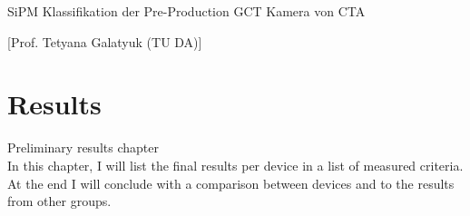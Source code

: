 \documentclass[article,type=msc,colorback,accentcolor=tud9c]{tudthesis}
\begin{document}
{SiPM Klassifikation der Pre-Production GCT Kamera von CTA}
\author{Ben Gebhardt}
[Prof. Tetyana Galatyuk (TU DA)]
\dateofexam{\today}{\today}
\makethesistitle
{}

\section{Results}
Preliminary results chapter\\
In this chapter, I will list the final results per device in a list of measured criteria. At the end I will conclude with a comparison between devices and to the results from other groups.
\end{document}
